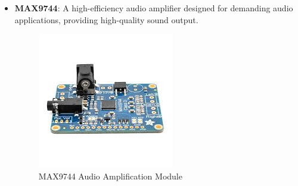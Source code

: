 \begin{itemize}
	\item \textbf{MAX9744}: A high-efficiency audio amplifier designed for demanding audio applications, providing high-quality sound output.
	\begin{figure}[h!]
		\centering
		\includegraphics[width=0.3\linewidth]{assets/ch2/MAX9744}
		\caption{MAX9744 Audio Amplification Module}
		\label{fig:max9744}
	\end{figure}
	
\end{itemize}

